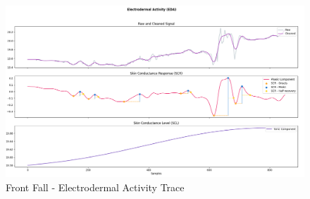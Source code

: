 \begin{figure}[h]
    \centering
    \includegraphics[width=\textwidth]{./images/bitalino/Front.png}
    \caption{Front Fall - Electrodermal Activity Trace}
    \label{fig:bitalino-front}
\end{figure}



